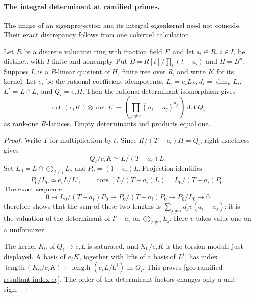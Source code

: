 \paragraph{The integral determinant at ramified primes.}
The image of an eigenprojection and its integral eigenkernel need not
coincide. Their exact discrepancy follows from one cokernel calculation.

\begin{lemma}\label{geo-ramified-resultant-index}
Let $R$ be a discrete valuation ring with fraction field $F$, and let
$a_i\in R$, $i\in I$, be distinct, with $I$ finite and nonempty.
Put $B=R[t]/\prod_i(t-a_i)$ and $H=B^n$.
Suppose $L$ is a $B$-linear quotient of $H$, finite free over $R$,
and write $K$ for its kernel. Let $e_i$ be the rational coefficient
idempotents, $L_i=e_iL_F$, $d_i=\dim_F L_i$,
$L^i=L\cap L_i$ and $Q_i=e_iH$.
Then the rational determinant isomorphism gives
\begin{equation}\label{geo-ramified-resultant-index-eq}
 \det(e_iK)\otimes\det L^i
   =\left(\prod_{j\ne i}(a_i-a_j)^{d_j}\right)\det Q_i
\end{equation}
as rank-one $R$-lattices. Empty determinants and products equal one.
\end{lemma}
\begin{proof}
Write $T$ for multiplication by $t$. Since
$H/(T-a_i)H=Q_i$, right exactness gives
\[
 Q_i/e_iK\simeq L/(T-a_i)L.
\]
Set $L_0=L\cap\bigoplus_{j\ne i}L_j$ and $P_0=(1-e_i)L$.
Projection identifies
\[
 P_0/L_0\simeq e_iL/L^i,
 \qquad
 \operatorname{tors}(L/(T-a_i)L)=L_0/(T-a_i)P_0.
\]
The exact sequence
\[
 0\longrightarrow L_0/(T-a_i)P_0
 \longrightarrow P_0/(T-a_i)P_0
 \longrightarrow P_0/L_0\longrightarrow0
\]
therefore shows that the sum of these two lengths is
$\sum_{j\ne i}d_jv(a_i-a_j)$: it is the valuation of the
determinant of $T-a_i$ on $\bigoplus_{j\ne i}L_j$.
Here $v$ takes value one on a uniformizer.

The kernel $K_0$ of $Q_i\to e_iL$ is saturated, and
$K_0/e_iK$ is the torsion module just displayed.
A basis of $e_iK$, together with lifts of a basis of $L^i$,
has index
$\operatorname{length}(K_0/e_iK)+
 \operatorname{length}(e_iL/L^i)$ in $Q_i$.
This proves \eqref{geo-ramified-resultant-index-eq}.
The order of the determinant factors changes only a unit sign.
\end{proof}

